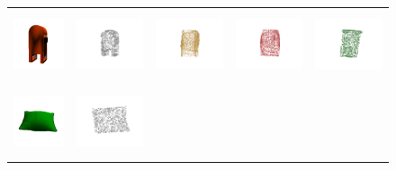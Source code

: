 \documentclass[bachelor, nocolorlinks, printoneside]{seuthesis} %
\begin{document}
\begin{Appendix}{}
\begin{figure}[!h]
\begin{tabular}{c@{}c@{}c@{}c@{}c@{}}
            \includegraphics[width=0.11\columnwidth,height=1.7cm]{figs/supp_real_dataset/Image/mailbox_81f30bae0a1474fff601d2ded3aef05a.png} &
            \includegraphics[width=0.22\columnwidth,height=2cm]{figs/supp_real_dataset/GT/mailbox_81f30bae0a1474fff601d2ded3aef05a_gt.png} &
            \includegraphics[width=0.22\columnwidth,height=2cm]{figs/supp_real_dataset/AE_label/mailbox_81f30bae0a1474fff601d2ded3aef05a_label.png} &
            \includegraphics[width=0.22\columnwidth,height=2cm]{figs/supp_real_dataset/AE/mailbox_81f30bae0a1474fff601d2ded3aef05a_pred.png} &
            \includegraphics[width=0.22\columnwidth,height=2cm]{figs/supp_real_dataset/oracle/mailbox_81f30bae0a1474fff601d2ded3aef05a_oracle.png} \\
            \vspace{-5mm}
            \includegraphics[width=0.12\columnwidth,height=2cm]{figs/supp_real_dataset/Image/pillow_68131b4f51579263f7b57f419ab2620.png} &
            \includegraphics[width=0.22\columnwidth,height=2cm]{figs/supp_real_dataset/GT/pillow_68131b4f51579263f7b57f419ab2620_gt.png} &

\end{tabular}
\end{figure}
\end{Appendix}
\end{document}
